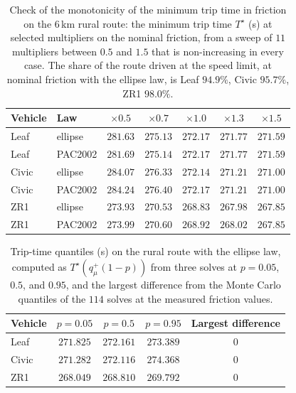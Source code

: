 \begin{table}[htbp]
\centering\small
\caption{Check of the monotonicity of the minimum trip time in friction on the $6$\,km rural route: the minimum trip time $T^\star$ (s) at selected multipliers on the nominal friction, from a sweep of $11$ multipliers between $0.5$ and $1.5$ that is non-increasing in every case. The share of the route driven at the speed limit, at nominal friction with the ellipse law, is Leaf $94.9\%$, Civic $95.7\%$, ZR1 $98.0\%$.}\label{tab:app-transit}
\begin{tabular}{llccccc}
\toprule
Vehicle & Law & $\times0.5$ & $\times0.7$ & $\times1.0$ & $\times1.3$ & $\times1.5$\\
\midrule
Leaf & ellipse & $281.63$ & $275.13$ & $272.17$ & $271.77$ & $271.59$\\
Leaf & PAC2002 & $281.69$ & $275.14$ & $272.17$ & $271.77$ & $271.59$\\
Civic & ellipse & $284.07$ & $276.33$ & $272.14$ & $271.21$ & $271.00$\\
Civic & PAC2002 & $284.24$ & $276.40$ & $272.17$ & $271.21$ & $271.00$\\
ZR1 & ellipse & $273.93$ & $270.53$ & $268.83$ & $267.98$ & $267.85$\\
ZR1 & PAC2002 & $273.99$ & $270.60$ & $268.92$ & $268.02$ & $267.85$\\
\bottomrule
\end{tabular}
\end{table}

\begin{table}[htbp]
\centering\small
\caption{Trip-time quantiles (s) on the rural route with the ellipse law, computed as $T^\star(q^{+}_\mu(1-p))$ from three solves at $p=0.05$, $0.5$, and $0.95$, and the largest difference from the Monte Carlo quantiles of the $114$ solves at the measured friction values.}\label{tab:app-transitq}
\begin{tabular}{lcccc}
\toprule
Vehicle & $p=0.05$ & $p=0.5$ & $p=0.95$ & Largest difference\\
\midrule
Leaf & $271.825$ & $272.161$ & $273.389$ & $0$\\
Civic & $271.282$ & $272.116$ & $274.368$ & $0$\\
ZR1 & $268.049$ & $268.810$ & $269.792$ & $0$\\
\bottomrule
\end{tabular}
\end{table}

